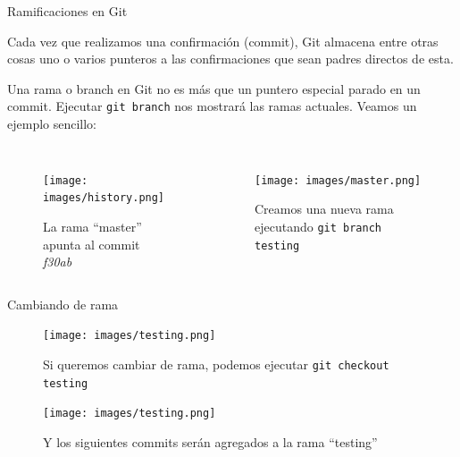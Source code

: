 \documentclass{beamer}
\begin{document}
\begin{frame}{Ramificaciones en Git}

    Cada vez que realizamos una confirmación (commit), Git almacena entre otras cosas uno o varios punteros a las confirmaciones que
    sean padres directos de esta.

    Una rama o branch en Git no es más que un puntero especial parado en un commit. Ejecutar \texttt{git branch} nos mostrará las ramas actuales. Veamos un ejemplo sencillo:

    \begin{columns}
        \begin{figure}[ht]
            \begin{center}
                \texttt{[image: images/history.png]}
            \end{center}
            \caption{La rama ``master'' apunta al commit \textit{f30ab}}
        \end{figure}
        \begin{figure}[ht]
            \begin{center}
                \texttt{[image: images/master.png]}
            \end{center}
            \caption{Creamos una nueva rama ejecutando \texttt{git branch testing}}
        \end{figure}
    \end{columns}

\end{frame}

\begin{frame}{Cambiando de rama}

    \begin{figure}[ht]
        \begin{center}
            \texttt{[image: images/testing.png]}
        \end{center}
        \caption{Si queremos cambiar de rama, podemos ejecutar \texttt{git checkout testing}}
    \end{figure}
    \begin{figure}[ht]
        \begin{center}
            \texttt{[image: images/testing.png]}
        \end{center}
        \caption{Y los siguientes commits serán agregados a la rama ``testing''}
    \end{figure}

\end{frame}
\end{document}
